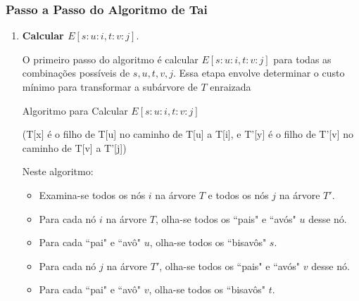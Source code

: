 \documentclass[12pt]{article}
\begin{document}
\subsubsection{Passo a Passo do Algoritmo de Tai}



\begin{enumerate}
    \item \textbf{Calcular \( E[s:u:i, t:v:j] \)}.
    

O primeiro passo do algoritmo é calcular \( E[s:u:i, t:v:j] \) para todas as combinações possíveis de \( s, u, t, v, j \). Essa etapa envolve determinar o custo mínimo para transformar a subárvore de \( T \) enraizada 

\begin{algorithm}[H]
\caption{Algoritmo para Calcular \( E[s:u:i, t:v:j] \)}
(T[x] é o filho de T[u] no caminho de T[u] a T[i], e T'[y] é o filho de T'[v] no caminho de T[v] a T'[j])
\end{algorithm}
Neste algoritmo:
\begin{itemize}
    \item Examina-se todos os nós \(i\) na árvore \(T\) e todos os nós \(j\) na árvore \(T'\).
    \item Para cada nó \(i\) na árvore \(T\), olha-se todos os ``pais" e ``avós" \(u\) desse nó.
    \item Para cada  ``pai" e ``avô" \(u\), olha-se todos os ``bisavôs" \(s\).
    \item Para cada nó \(j\) na árvore \(T'\), olha-se todos os ``pais" e ``avós" \(v\) desse nó.
    \item Para cada ``pai" e ``avô" \(v\), olha-se todos os ``bisavôs" \(t\).
    

\end{itemize}
\end{enumerate}
\end{document}
